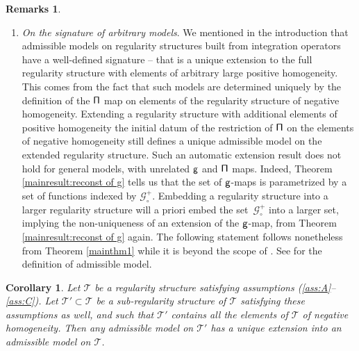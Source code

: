 \documentclass[11pt]{article}
\numberwithin{equation}{section}
\theoremstyle{plain}
\newtheorem{cor}[thm]{Corollary}
\theoremstyle{definition}
\newtheorem*{remarks*} {Remarks}
\newcommand{\scrT}{\mathscr{T}}
\newcommand{\bbR}{\mathbb{R}}
\newcommand{\bbZ}{\mathbb{Z}}
\newcommand{\mcG}{\mathcal{G}}
\begin{document}
\begin{remarks*}
\begin{enumerate}
(Theorem \ref{mainthm1} cannot be applied in a finite region $[0,T]$ directly. To overcome this point, we extend a function $f\in C([0,T], \bbR^\ell)$ to $[-T,T]$ symmetrically, and extend it to $\big[(2n-1)T, (2n+1)T\big]$ for any $n\in\bbZ$ periodically. Then for any $\alpha\in(0,1)$, the Hölder space $C^\alpha([0,T],\bbR^\ell)$ is identified with the space
\[
C_{p,s}^\alpha(\bbR, \bbR^\ell) := \Big\{ f\in C^\alpha(\bbR,\bbR^\ell)\,;\, f(t)=f(-t),\ f(t+2T)=f(t)\ \text{for any $t\in \bbR$} \Big\}.
\]
Note that Littlewood-Paley blocks $\Delta_i$ preserve the symmetry and periodicity, so such spaces are closed under paradifferential operators (paraproduct, its two-parameter extension, etc.) used in this paper. Hence we can apply Theorem \ref{mainthm1} to such spaces.)

\item
\emph{On the signature of arbitrary models}. We mentioned in the introduction that admissible models on regularity structures built from integration operators have a well-defined signature -- that is a unique extension to the full regularity structure with elements of arbitrary large positive homogeneity. This comes from the fact that such models are determined uniquely by the definition of the $\sf \Pi$ map on elements of the regularity structure of negative homogeneity. Extending a regularity structure with additional elements of positive homogeneity the initial datum of the restriction of $\sf \Pi$ on the elements of negative homogeneity still defines a unique admissible model on the extended regularity structure. Such an automatic extension result does not hold for general models, with unrelated $\sf g$ and $\sf \Pi$ maps. Indeed, Theorem \ref{mainresult:reconst of g} tells us that the set of $\sf g$-maps is parametrized by a set of functions indexed by $\mcG^+_\circ$. Embedding a regularity structure into a larger regularity structure will a priori embed the set~$\mcG^+_\circ$ into a larger set, implying the non-uniqueness of an extension of the $\sf g$-map, from Theorem \ref{mainresult:reconst of g} again. The following statement follows nonetheless from Theorem \ref{mainthm1} while it is beyond the scope of \cite[Th.\,21]{BH}. See \cite[\S4]{BH} for the definition of admissible model.
\end{enumerate}
\end{remarks*}

\begin{cor}
Let $\scrT$ be a regularity structure satisfying assumptions \textup{(\ref{ass:A}--\ref{ass:C})}. Let $\scrT'\subset\scrT$ be a sub-regularity structure of $\scrT$ satisfying these assumptions as well, and such that $\scrT'$ contains all the elements of $\scrT$ of negative homogeneity. Then any admissible model on $\scrT'$ has a unique extension into an admissible model on $\scrT$.
\end{cor}
\end{document}
